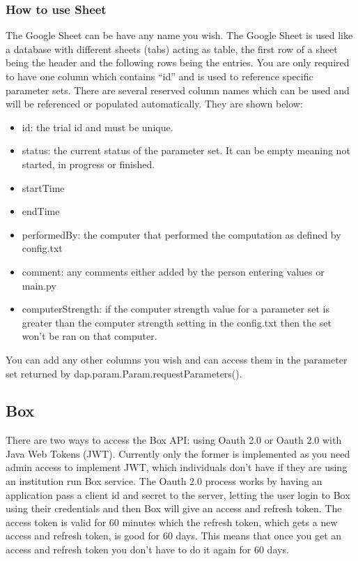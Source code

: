 \documentclass[12pt]{article}
\begin{document}
\subsubsection{How to use Sheet}
The Google Sheet can be have any name you wish.  The Google Sheet is used like a database with different sheets (tabs) acting as table, the first row of a sheet being the header and the following rows being the entries.  You are only required to have one column which contains ``id'' and is used to reference specific parameter sets.  There are several reserved column names which can be used and will be referenced or populated automatically.  They are shown below:
\begin{itemize}
	\item id: the trial id and must be unique.
	\item status: the current status of the parameter set.  It can be empty meaning not started, in progress or finished.
	\item startTime
	\item endTime
	\item performedBy: the computer that performed the computation as defined by config.txt
	\item comment: any comments either added by the person entering values or main.py
	\item computerStrength: if the computer strength value for a parameter set is greater than the computer strength setting in the config.txt then the set won't be ran on that computer. 
\end{itemize}

You can add any other columns you wish and can access them in the parameter set returned by dap.param.Param.requestParameters().\\


\subsection{Box}
There are two ways to access the Box API: using Oauth 2.0 or Oauth 2.0 with Java Web Tokens (JWT).  Currently only the former is implemented as you need admin access to implement JWT, which individuals don't have if they are using an institution run Box service.  The Oauth 2.0 process works by having an application pass a client id and secret to the server, letting the user login to Box using their credentials and then Box will give an access and refresh token.  The access token is valid for 60 minutes which the refresh token, which gets a new access and refresh token, is good for 60 days.  This means that once you get an access and refresh token you don't have to do it again for 60 days.\\
\end{document}
